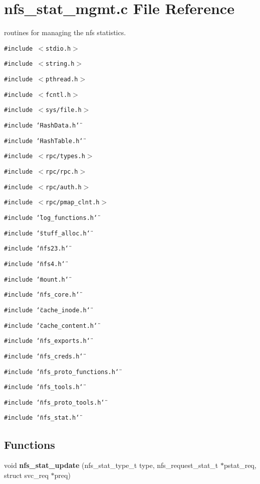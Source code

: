 \section{nfs\_\-stat\_\-mgmt.c File Reference}
\label{nfs__stat__mgmt_8c}
routines for managing the nfs statistics. 

{\tt \#include $<$stdio.h$>$}\par
{\tt \#include $<$string.h$>$}\par
{\tt \#include $<$pthread.h$>$}\par
{\tt \#include $<$fcntl.h$>$}\par
{\tt \#include $<$sys/file.h$>$}\par
{\tt \#include \char`\"{}Hash\-Data.h\char`\"{}}\par
{\tt \#include \char`\"{}Hash\-Table.h\char`\"{}}\par
{\tt \#include $<$rpc/types.h$>$}\par
{\tt \#include $<$rpc/rpc.h$>$}\par
{\tt \#include $<$rpc/auth.h$>$}\par
{\tt \#include $<$rpc/pmap\_\-clnt.h$>$}\par
{\tt \#include \char`\"{}log\_\-functions.h\char`\"{}}\par
{\tt \#include \char`\"{}stuff\_\-alloc.h\char`\"{}}\par
{\tt \#include \char`\"{}nfs23.h\char`\"{}}\par
{\tt \#include \char`\"{}nfs4.h\char`\"{}}\par
{\tt \#include \char`\"{}mount.h\char`\"{}}\par
{\tt \#include \char`\"{}nfs\_\-core.h\char`\"{}}\par
{\tt \#include \char`\"{}cache\_\-inode.h\char`\"{}}\par
{\tt \#include \char`\"{}cache\_\-content.h\char`\"{}}\par
{\tt \#include \char`\"{}nfs\_\-exports.h\char`\"{}}\par
{\tt \#include \char`\"{}nfs\_\-creds.h\char`\"{}}\par
{\tt \#include \char`\"{}nfs\_\-proto\_\-functions.h\char`\"{}}\par
{\tt \#include \char`\"{}nfs\_\-tools.h\char`\"{}}\par
{\tt \#include \char`\"{}nfs\_\-proto\_\-tools.h\char`\"{}}\par
{\tt \#include \char`\"{}nfs\_\-stat.h\char`\"{}}\par
\subsection*{Functions}
\begin{CompactItemize}
\item 
void {\bf nfs\_\-stat\_\-update} (nfs\_\-stat\_\-type\_\-t type, nfs\_\-request\_\-stat\_\-t $\ast$pstat\_\-req, struct svc\_\-req $\ast$preq)
\end{CompactItemize}
